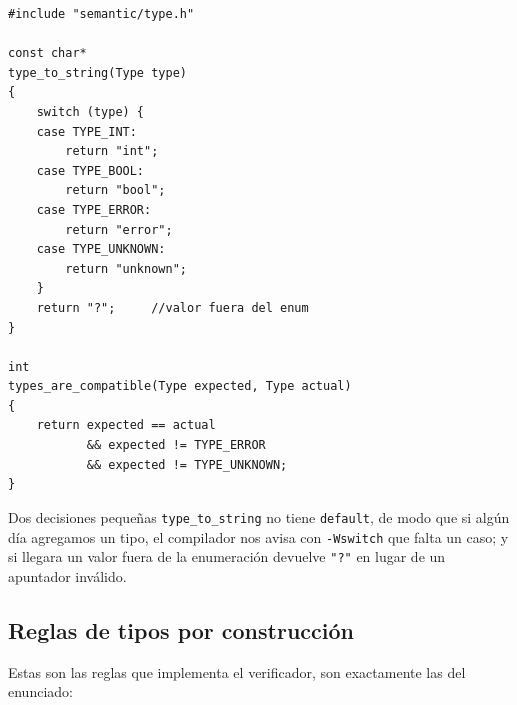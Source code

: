 \documentclass[12pt,letterpaper]{article}
\begin{document}
\begin{lstlisting}[style=modernc, caption={\texttt{type.c} completo.}]
#include "semantic/type.h"

const char*
type_to_string(Type type)
{
    switch (type) {
    case TYPE_INT:
        return "int";
    case TYPE_BOOL:
        return "bool";
    case TYPE_ERROR:
        return "error";
    case TYPE_UNKNOWN:
        return "unknown";
    }
    return "?";     //valor fuera del enum
}

int
types_are_compatible(Type expected, Type actual)
{
    return expected == actual
           && expected != TYPE_ERROR
           && expected != TYPE_UNKNOWN;
}
\end{lstlisting}

\bigskip

Dos decisiones pequeñas \texttt{type\_to\_string} no tiene \texttt{default}, de modo que si algún día agregamos
un tipo, el compilador nos avisa con \texttt{-Wswitch} que falta un caso; y si llegara un valor fuera de la
enumeración devuelve \texttt{"?"} en lugar de un apuntador inválido.

\subsection*{Reglas de tipos por construcción}

Estas son las reglas que implementa el verificador, son exactamente las del enunciado:
\end{document}
